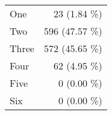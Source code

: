 \begin{tabular}{ l  r }
One & 23 (1.84 \%)\\
Two & 596 (47.57 \%)\\
Three & 572 (45.65 \%)\\
Four & 62 (4.95 \%)\\
Five & 0 (0.00 \%)\\
Six & 0 (0.00 \%)\\
\end{tabular}